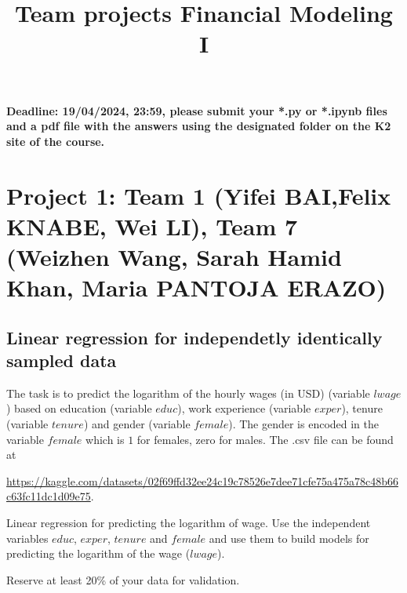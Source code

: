 \documentclass{article}
\title{Team projects Financial Modeling I}
\author{}
\date{}
\begin{document}
\maketitle

\textbf{Deadline: 19/04/2024, 23:59,  please submit your *.py or *.ipynb files and a pdf file with the answers 
       using the designated folder on the K2 site of the course.}

\section*{Project 1: Team 1 (Yifei BAI,Felix KNABE, Wei LI), Team 7 (Weizhen Wang, Sarah Hamid Khan, Maria PANTOJA ERAZO) }

 \subsection*{Linear regression for independetly identically sampled data}
  The task is to  predict the logarithm of the hourly wages (in USD) (variable $lwage$) based on education (variable $educ$), work experience (variable $exper$), tenure (variable $tenure$) and gender (variable $female$). The gender is encoded in the variable $female$ which is $1$ for   females, zero for males. 
 The .csv file can be found at %

 \url{https://kaggle.com/datasets/02f69ffd32ee24c19c78526e7dee71cfe75a475a78c48b66c63fc11dc1d09e75}. 

 Linear regression for predicting the logarithm of wage. 
 Use the independent variables $educ$, $exper$, $tenure$ and $female$
 and use them to build models for predicting the logarithm of the wage ($lwage$).

 Reserve at least 20\% of your data for validation.
\end{document}
